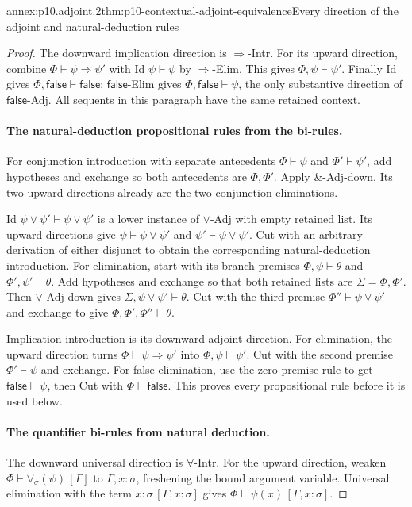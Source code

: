 \begin{annexitem}{annex:p10.adjoint.2}{thm:p10-contextual-adjoint-equivalence}{Every direction of the adjoint and natural-deduction rules}
\begin{proof}
The downward implication direction is \(\Rightarrow\)-Intr.
For its upward direction, combine
\(\Phi\vdash\psi\Rightarrow\psi'\) with Id
\(\psi\vdash\psi\) by \(\Rightarrow\)-Elim. This gives
\(\Phi,\psi\vdash\psi'\).
Finally Id gives \(\Phi,\mathsf{false}\vdash\mathsf{false}\);
\(\mathsf{false}\)-Elim gives
\(\Phi,\mathsf{false}\vdash\psi\), the only substantive
direction of \(\mathsf{false}\)-Adj.
All sequents in this paragraph have the same retained context.

\paragraph{The natural-deduction propositional rules from the bi-rules.}
For conjunction introduction with separate antecedents
\(\Phi\vdash\psi\) and \(\Phi'\vdash\psi'\), add hypotheses
and exchange so both antecedents are \(\Phi,\Phi'\).
Apply \(\&\)-Adj-down. Its two upward directions already are
the two conjunction eliminations.

Id \(\psi\vee\psi'\vdash\psi\vee\psi'\) is a lower
instance of \(\vee\)-Adj with empty retained list.
Its upward directions give
\(\psi\vdash\psi\vee\psi'\) and
\(\psi'\vdash\psi\vee\psi'\).
Cut with an arbitrary derivation of either disjunct to obtain
the corresponding natural-deduction introduction.
For elimination, start with its branch premises
\(\Phi,\psi\vdash\theta\) and
\(\Phi',\psi'\vdash\theta\).
Add hypotheses and exchange so that both retained lists are
\(\Sigma=\Phi,\Phi'\). Then \(\vee\)-Adj-down gives
\(\Sigma,\psi\vee\psi'\vdash\theta\).
Cut with the third premise \(\Phi''\vdash\psi\vee\psi'\)
and exchange to give \(\Phi,\Phi',\Phi''\vdash\theta\).

Implication introduction is its downward adjoint direction.
For elimination, the upward direction turns
\(\Phi\vdash\psi\Rightarrow\psi'\) into
\(\Phi,\psi\vdash\psi'\).
Cut with the second premise \(\Phi'\vdash\psi\) and exchange.
For false elimination, use the zero-premise rule to get
\(\mathsf{false}\vdash\psi\), then Cut with
\(\Phi\vdash\mathsf{false}\).
This proves every propositional rule before it is used below.

\paragraph{The quantifier bi-rules from natural deduction.}
The downward universal direction is \(\forall\)-Intr.
For the upward direction, weaken
\(\Phi\vdash\forall_\sigma(\psi)\,[\Gamma]\) to
\(\Gamma,x:\sigma\), freshening the bound argument variable.
Universal elimination with the term \(x:\sigma\,[\Gamma,x:\sigma]\)
gives \(\Phi\vdash\psi(x)\,[\Gamma,x:\sigma]\).


\end{proof}
\end{annexitem}
